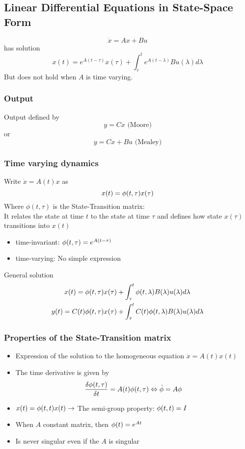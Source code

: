 \subsection{Linear Differential Equations in State-Space Form}%
\label{dls:sub:linear_differential_equations_in_state_space_form}
\[\dot{x} = Ax + Bu\]
has solution 
\[x(t) = e^{A(t - \tau)} x(\tau) + \int_\tau^t e^{A(t - \lambda)} B u(\lambda) d\lambda\]
But does not hold when \(A\) is time varying.

\subsubsection{Output}%
\label{dls:ssub:output}
Output defined by
\[y = Cx \text{ (Moore)} \]
or
\[ y = Cx + Bu \text{ (Mealey)}\]

\subsubsection{Time varying dynamics}%
\label{dls:ssub:time_varying_dynamics}
Write \(\dot{x} = A(t)x\) as
\[x(t) = \phi(t,\tau)x(\tau)\]
Where \(\phi(t,\tau)\) is the State-Transition matrix:\\
It relates the state at time \(t\) to the state at time \(\tau\) and defines how state \(x(\tau)\) transitions
into \(x(t)\)
\begin{itemize}
\item time-invariant: \(\phi(t,\tau) = e^{A(t-\tau)}\)
\item time-varying: No simple expression
\end{itemize}
General solution
\begin{align*}
  x(t) = \phi(t, \tau)x(\tau) &+ \int_\tau^t \phi(t,\lambda)B(\lambda)u(\lambda)d\lambda\\
  y(t) = C(t)\phi(t, \tau)x(\tau) &+ \int_\tau^t C(t) \phi(t,\lambda)B(\lambda)u(\lambda)d\lambda
\end{align*}

\subsubsection{Properties of the State-Transition matrix}%
\label{dls:ssub:properties_of_the_state_transition_matrix}
\begin{itemize}
\item Expression of the solution to the homogeneous equation \(\dot{x} = A(t)x(t)\)
\item The time derivative is given by \[\frac{\delta\phi(t,\tau)}{\delta t} = A(t)\phi(t,\tau)
    \Leftrightarrow \dot{\phi} = A \phi\]
\item \(x(t) = \phi(t,t) x(t) \rightarrow \) The semi-group property: \(\phi(t,t) = I\)
\item When \(A\) constant matrix, then \(\phi(t) = e^{At}\)
\item Is never singular even if the \(A\) is singular
\end{itemize}

